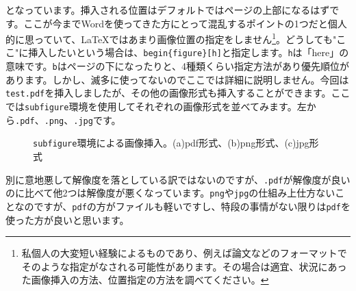 \documentclass[a4paper,papersize,uplatex,dvipdfmx,10pt]{jsarticle}
\newcommand{\bs}{\symbol{92}} %
\begin{document}
となっています。挿入される位置はデフォルトではページの上部になるはずです。ここが今までWordを使ってきた方にとって混乱するポイントの1つだと個人的に思っていて、\LaTeX{}ではあまり画像位置の指定をしません\footnote{私個人の大変短い経験によるものであり、例えば論文などのフォーマットでそのような指定がなされる可能性があります。その場合は適宜、状況にあった画像挿入の方法、位置指定の方法を調べてください。}。どうしても"ここ"に挿入したいという場合は、\texttt{\bs begin\{figure\}[h]}と指定します。\texttt{h}は「here」の意味です。\texttt{b}はページの下になったりと、4種類くらい指定方法があり優先順位があります。しかし、滅多に使ってないのでここでは詳細に説明しません。今回は\texttt{test.pdf}を挿入しましたが、その他の画像形式も挿入することができます。ここでは\texttt{subfigure}環境を使用してそれぞれの画像形式を並べてみます。左から\texttt{.pdf}、\texttt{.png}、\texttt{.jpg}です。
\begin{figure}
  \centering
  \caption[\texttt{subfigure}環境による画像挿入]{\texttt{subfigure}環境による画像挿入。(a)pdf形式、(b)png形式、(c)jpg形式}
  \label{fig:co_vs_ci_sb}
\end{figure}
別に意地悪して解像度を落としている訳ではないのですが、\texttt{.pdf}が解像度が良いのに比べて他2つは解像度が悪くなっています。\texttt{png}や\texttt{jpg}の仕組み上仕方ないことなのですが、\texttt{pdf}の方がファイルも軽いですし、特段の事情がない限りは\texttt{pdf}を使った方が良いと思います。
\end{document}
